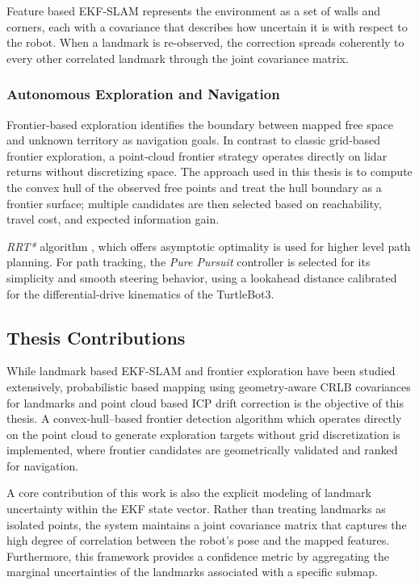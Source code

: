 \documentclass[11pt]{article}
\begin{document}
Feature based EKF-SLAM represents the environment as a set of walls and corners, each with a covariance that describes how uncertain it is with respect to the robot. When a landmark is re-observed, the correction spreads coherently to every other correlated landmark through the joint covariance matrix.



\subsubsection{Autonomous Exploration and Navigation}

Frontier-based exploration identifies the boundary between mapped free space and unknown territory as navigation goals. In contrast to classic grid‑based frontier exploration\cite{Yamauchi1997}, a point‑cloud frontier strategy operates directly on lidar returns without discretizing space. The approach used in this thesis is to compute the convex hull of the observed free points and treat the hull boundary as a frontier surface; multiple candidates are then selected based on reachability, travel cost, and expected information gain. 

\textit{RRT*} algorithm \cite{karaman2011sampling}, which offers asymptotic optimality is used for higher level path planning. For path tracking, the \textit{Pure Pursuit} controller \cite{coulter1992} is selected for its simplicity and smooth steering behavior, using a lookahead distance calibrated for the differential-drive kinematics of the TurtleBot3.


\subsection{Thesis Contributions}

While landmark based EKF-SLAM and frontier exploration have been studied extensively, probabilistic based mapping using geometry-aware CRLB covariances for landmarks and point cloud based ICP drift correction is the objective of this thesis. A convex‑hull–based frontier detection algorithm which operates directly on the point cloud to generate exploration targets without grid discretization is implemented, where frontier candidates are geometrically validated and ranked for navigation.

A core contribution of this work is also the explicit modeling of landmark uncertainty within the EKF state vector. Rather than treating landmarks as isolated points, the system maintains a joint covariance matrix that captures the high degree of correlation between the robot’s pose and the mapped features. Furthermore, this framework provides a confidence metric by aggregating the marginal uncertainties of the landmarks associated with a specific submap.
\end{document}
